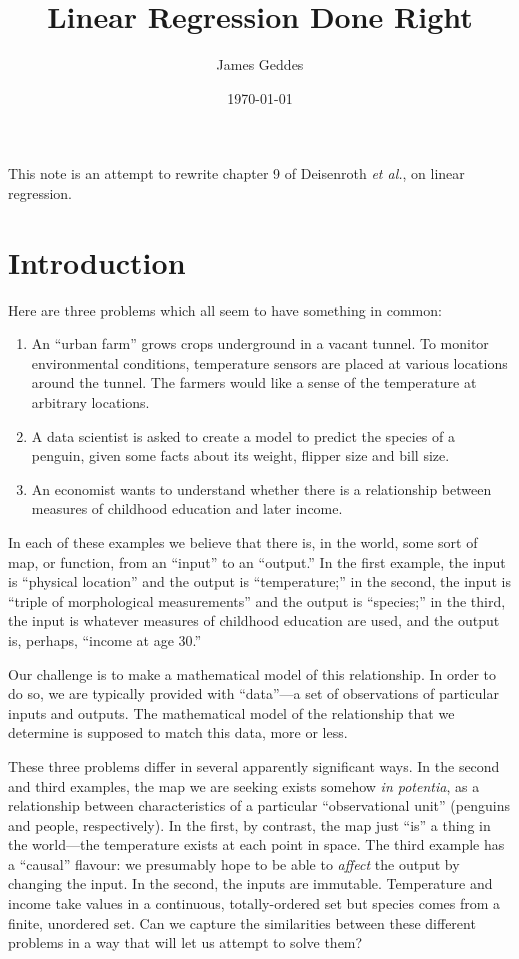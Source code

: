 \documentclass[10pt, a4paper]{article}
\author{James Geddes}
\date{\today}
\title{Linear Regression Done Right}
\begin{document}
\maketitle

This note is an attempt to rewrite chapter 9 of Deisenroth \emph{et
al.}, on linear regression.

\section*{Introduction}

Here are three problems which all seem to have something in common:

\begin{enumerate}
\item An ``urban farm'' grows crops underground in a vacant tunnel. To
  monitor environmental conditions, temperature sensors are placed at
  various locations around the tunnel. The farmers would like a sense
  of the temperature at arbitrary locations.
\item A data scientist is asked to create a model to predict the
  species of a penguin, given some facts about its weight, flipper
  size and bill size.
\item An economist wants to understand whether there is a relationship
  between measures of childhood education and later income.
\end{enumerate}

In each of these examples we believe that there is, in the world, some
sort of map, or function, from an “input” to an “output.” In the first
example, the input is “physical location” and the output is
“temperature;” in the second, the input is “triple of morphological
measurements” and the output is “species;” in the third, the input is
whatever measures of childhood education are used, and the output is,
perhaps, “income at age 30.”

Our challenge is to make a mathematical model of this relationship. In
order to do so, we are typically provided with “data”---a set of
observations of particular inputs and outputs. The mathematical model
of the relationship that we determine is supposed to match this data,
more or less.

These three problems differ in several apparently significant
ways. In the second and third examples, the map we are seeking exists
somehow \emph{in potentia}, as a relationship between characteristics
of a particular “observational unit” (penguins and people,
respectively). In the first, by contrast, the map just “is” a thing in
the world---the temperature exists at each point in space. The third
example has a “causal” flavour: we presumably hope to be able to
\emph{affect} the output by changing the input. In the second, the
inputs are immutable. Temperature and income take values in a
continuous, totally-ordered set but species comes from a finite,
unordered set. Can we capture the similarities between these different
problems in a way that will let us attempt to solve them?
\end{document}
